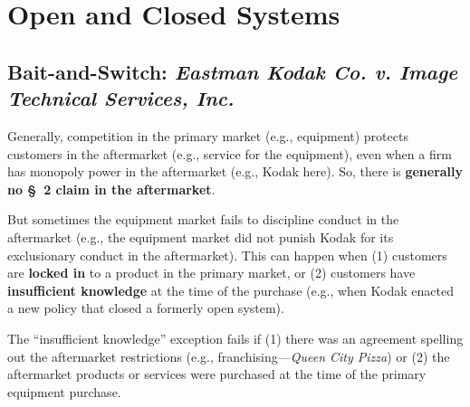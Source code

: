 \section{Open and Closed Systems}

\subsection{Bait-and-Switch: \emph{Eastman Kodak Co. v. Image Technical 
Services, Inc.}}

Generally, competition in the primary market (e.g., equipment) protects 
customers in the aftermarket (e.g., service for the equipment), even when a 
firm has monopoly power in the aftermarket (e.g., Kodak here). So, there is 
\textbf{generally no \S\ 2 claim in the aftermarket}.

But sometimes the equipment market fails to discipline conduct in the 
aftermarket (e.g., the equipment market did not punish Kodak for its 
exclusionary conduct in the aftermarket). This can happen when (1) customers 
are \textbf{locked in} to a product in the primary market, or (2) customers 
have \textbf{insufficient knowledge} at the time of the purchase (e.g., when 
Kodak enacted a new policy that closed a formerly open system).

The ``insufficient knowledge'' exception fails if (1) there was an agreement 
spelling out the aftermarket restrictions (e.g., franchising---\emph{Queen 
City Pizza}) or (2) the aftermarket products or services were purchased at the 
time of the primary equipment purchase.

